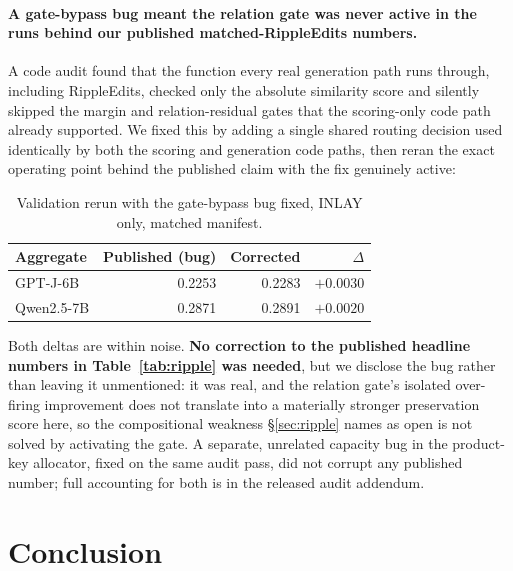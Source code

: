 \documentclass{article}
\begin{document}
\paragraph{A gate-bypass bug meant the relation gate was never active in the
runs behind our published matched-RippleEdits numbers.} A code audit found
that the function every real generation path runs through, including
RippleEdits, checked only the absolute similarity score and silently
skipped the margin and relation-residual gates that the scoring-only code
path already supported. We fixed this by adding a single shared routing
decision used identically by both the scoring and generation code paths,
then reran the exact operating point behind the published claim with the
fix genuinely active:

\begin{table}[t]
  \centering
  \small
  \begin{tabular}{@{}lrrr@{}}
    \toprule
    Aggregate & Published (bug) & Corrected & $\Delta$ \\
    \midrule
    GPT-J-6B    & 0.2253 & 0.2283 & $+0.0030$ \\
    Qwen2.5-7B  & 0.2871 & 0.2891 & $+0.0020$ \\
    \bottomrule
  \end{tabular}
  \caption{Validation rerun with the gate-bypass bug fixed, INLAY only,
  matched manifest.}
  \label{tab:gatebug}
\end{table}

Both deltas are within noise. \textbf{No correction to the published
headline numbers in Table~\ref{tab:ripple} was needed}, but we disclose the
bug rather than leaving it unmentioned: it was real, and the relation
gate's isolated over-firing improvement does not translate into a
materially stronger preservation score here, so the compositional
weakness \S\ref{sec:ripple} names as open is not solved by activating the
gate. A separate, unrelated capacity bug in the product-key allocator,
fixed on the same audit pass, did not corrupt any published number; full
accounting for both is in the released audit addendum.

\section{Conclusion}
\label{sec:conclusion}
\end{document}
